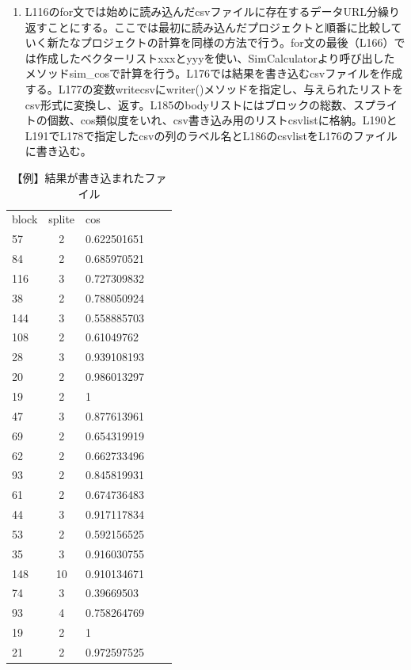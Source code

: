 \documentclass[a4paper,10pt,onecolumn,oneside,openany]{jsbook}
\begin{document}
\begin{enumerate}
\item L116のfor文では始めに読み込んだcsvファイルに存在するデータURL分繰り返すことにする。ここでは最初に読み込んだプロジェクトと順番に比較していく新たなプロジェクトの計算を同様の方法で行う。for文の最後（L166）では作成したベクターリストxxxとyyyを使い、SimCalculatorより呼び出したメソッドsim\_cosで計算を行う。L176では結果を書き込むcsvファイルを作成する。L177の変数writecsvにwriter()メソッドを指定し、与えられたリストをcsv形式に変換し、返す。L185のbodyリストにはブロックの総数、スプライトの個数、cos類似度をいれ、csv書き込み用のリストcsvlistに格納。L190とL191でL178で指定したcsvの列のラベル名とL186のcsvlistをL176のファイルに書き込む。
\end{enumerate}

\begin{table}[h]
 \caption{【例】結果が書き込まれたファイル}
 \label{resultex}
 \begin{center}
\begin{tabular}{lclcl}
block & splite & cos \\
57 & 2 & 0.622501651 \\
84 & 2 & 0.685970521 \\
116 & 3 & 0.727309832 \\
38 & 2 & 0.788050924 \\
144 & 3 & 0.558885703 \\
108 & 2 & 0.61049762 \\
28 & 3 & 0.939108193 \\
20 & 2 & 0.986013297 \\
19 & 2 & 1 \\
47 & 3 & 0.877613961 \\
69 & 2 & 0.654319919 \\
62 & 2 & 0.662733496 \\
93 & 2 & 0.845819931 \\
61 & 2 & 0.674736483 \\
44 & 3 & 0.917117834 \\
53 & 2 & 0.592156525 \\
35 & 3 & 0.916030755 \\
148 & 10 & 0.910134671 \\
74 & 3 & 0.39669503 \\
93 & 4 & 0.758264769 \\
19 & 2 & 1 \\
21 & 2 & 0.972597525 \\
\end{tabular}
\end{center}
\end{table}
\end{document}
